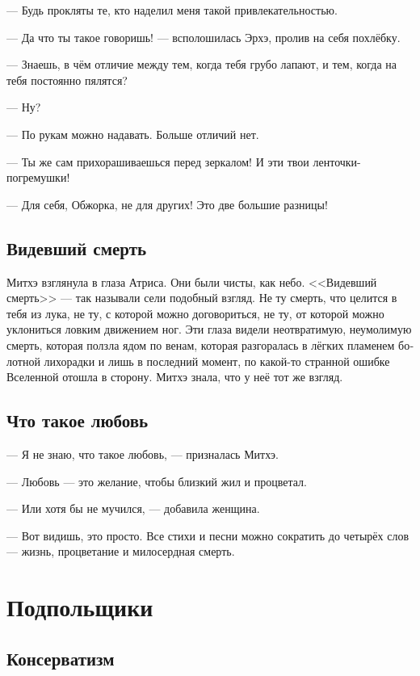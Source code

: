\documentclass[a4paper,12pt,fleqn]{book}\usepackage{cooltooltips}\usepackage{polyglossia}\setdefaultlanguage[babelshorthands=true]{russian}\setotherlanguage{english}\defaultfontfeatures{Ligatures=TeX,Mapping=tex-text} \usepackage{xcolor}\definecolor{lightgray}{HTML}{bbbbbb}\color{lightgray}\newcommand{\ml}[3]{\textenglish{\textcolor{black}{#3}}}
\begin{document}
{--- Будь прокляты те, кто наделил меня такой привлекательностью.

--- Да что ты такое говоришь! --- всполошилась Эрхэ, пролив на себя похлёбку.

--- Знаешь, в чём отличие между тем, когда тебя грубо лапают, и тем, когда на тебя постоянно пялятся?

--- Ну?

--- По рукам можно надавать.
Больше отличий нет.

--- Ты же сам прихорашиваешься перед зеркалом!
И эти твои ленточки-погремушки!

--- Для себя, Обжорка, не для других!
Это две большие разницы!

\section{Видевший смерть}

Митхэ взглянула в глаза Атриса.
Они были чисты, как небо.
<<Видевший смерть>> --- так называли сели подобный взгляд.
Не ту смерть, что целится в тебя из лука, не ту, с которой можно договориться, не ту, от которой можно уклониться ловким движением ног.
Эти глаза видели неотвратимую, неумолимую смерть, которая ползла ядом по венам, которая разгоралась в лёгких пламенем болотной лихорадки и лишь в последний момент, по какой-то странной ошибке Вселенной отошла в сторону.
Митхэ знала, что у неё тот же взгляд.

\section{Что такое любовь}

--- Я не знаю, что такое любовь, --- призналась Митхэ.

--- Любовь --- это желание, чтобы близкий жил и процветал.

--- Или хотя бы не мучился, --- добавила женщина.

--- Вот видишь, это просто.
Все стихи и песни можно сократить до четырёх слов --- жизнь, процветание и милосердная смерть.

\chapter{Подпольщики}

\section{Консерватизм}

}
\end{document}
